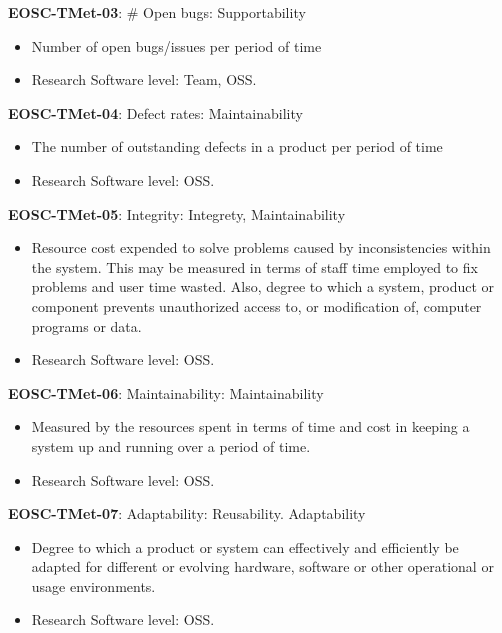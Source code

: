 \textbf{EOSC-TMet-03}: \# Open bugs: Supportability

\begin{itemize}
    \item Number of open bugs/issues per period of time~\cite{montagud_systematic_2012}
    \item Research Software level: Team, OSS.
\end{itemize}

\textbf{EOSC-TMet-04}: Defect rates: Maintainability

\begin{itemize}
    \item The number of outstanding defects in a product per period of time~\cite{crispin_driving_2006}
    \item Research Software level: OSS.
\end{itemize}

\textbf{EOSC-TMet-05}: Integrity: Integrety, Maintainability

\begin{itemize}
    \item Resource cost expended to solve problems caused by inconsistencies within the system. This may be measured in terms of staff time employed to fix problems and user time wasted. Also, degree to which a system, product or component prevents unauthorized access to, or modification of,
computer programs or data.~\cite{iso_25010_2011_2017,gillies_modelling_1992}
    \item Research Software level: OSS.
\end{itemize}

\textbf{EOSC-TMet-06}: Maintainability: Maintainability

\begin{itemize}
    \item Measured by the resources spent in terms of time and cost in keeping a system up and running over a period of time.~\cite{gillies_modelling_1992,boehm_quantitative_1976}
    \item Research Software level: OSS.
\end{itemize}

\textbf{EOSC-TMet-07}: Adaptability: Reusability. Adaptability

\begin{itemize}
    \item Degree to which a product or system can effectively and efficiently be adapted for different or evolving hardware, software or other operational or usage environments.~\cite{iso_25010_2011_2017,gillies_modelling_1992,boehm_quantitative_1976}
    \item Research Software level: OSS.
\end{itemize}

